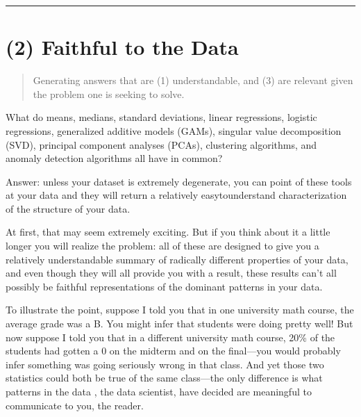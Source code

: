 \documentclass[letterpaper,10pt,english]{jupyterBook}
\begin{document}
\bigskip\hrule\bigskip


\sphinxstepscope


\section{(2) Faithful to the Data}
\label{\detokenize{30_questions/18_exploratory_internal_faithful:faithful-to-the-data}}\label{\detokenize{30_questions/18_exploratory_internal_faithful::doc}}\begin{quote}

\sphinxAtStartPar
Generating answers that are (1) understandable,  and (3) are relevant given the problem one is seeking to solve.
\end{quote}

\sphinxAtStartPar
What do means, medians, standard deviations, linear regressions, logistic regressions, generalized additive models (GAMs), singular value decomposition (SVD), principal component analyses (PCAs), clustering algorithms, and anomaly detection algorithms all have in common?

\sphinxAtStartPar
Answer: unless your dataset is extremely degenerate, you can point  of these tools at your data and they will return a relatively easy\sphinxhyphen{}to\sphinxhyphen{}understand characterization of the structure of your data.

\sphinxAtStartPar
At first, that may seem extremely exciting. But if you think about it a little longer you will realize the problem: all of these are designed to give you a relatively understandable summary of radically different properties of your data, and even though they will all provide you with a result, these results can’t all possibly be faithful representations of the dominant patterns in your data.

\sphinxAtStartPar
To illustrate the point, suppose I told you that in one university math course, the average grade was a B\sphinxhyphen{}. You might infer that students were doing pretty well! But now suppose I told you that in a different university math course, 20\% of the students had gotten a 0 on the midterm and on the final—you would probably infer something was going seriously wrong in that class. And yet those two statistics could both be true of the same class—the only difference is what patterns in the data , the data scientist, have decided are meaningful to communicate to you, the reader.
\end{document}
